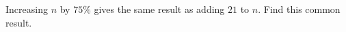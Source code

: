 Increasing $ n $ by $ 75\%$ gives the same result as adding $ 21 $ to $ n $. Find this common result.
